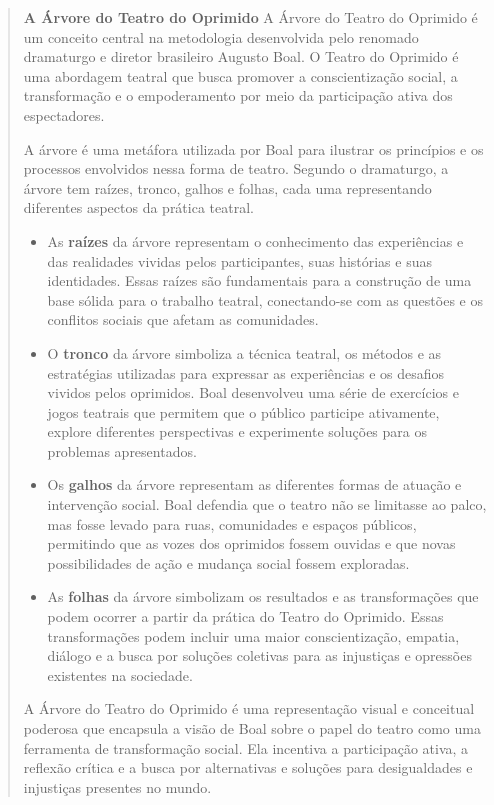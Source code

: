 \begin{quote}
\textbf{A Árvore do Teatro do Oprimido}
A Árvore do Teatro do Oprimido é um conceito central na metodologia desenvolvida pelo renomado dramaturgo e 
diretor brasileiro Augusto Boal. O Teatro do Oprimido é uma abordagem teatral que busca promover a 
conscientização social, a transformação e o empoderamento por meio da participação ativa dos espectadores.

A árvore é uma metáfora utilizada por Boal para ilustrar os princípios e os processos envolvidos nessa 
forma de teatro. Segundo o dramaturgo, a árvore tem raízes, tronco, galhos e folhas, cada uma representando diferentes aspectos da prática teatral.

\begin{itemize}
  \item As \textbf{raízes} da árvore representam o conhecimento das experiências e das realidades vividas 
  pelos participantes, suas histórias e suas identidades. Essas raízes são fundamentais para a construção 
  de uma base sólida para o trabalho teatral, conectando-se com as questões e os conflitos sociais que 
  afetam as comunidades.
  \item O \textbf{tronco} da árvore simboliza a técnica teatral, os métodos e as estratégias utilizadas 
  para expressar as experiências e os desafios vividos pelos oprimidos. Boal desenvolveu uma série de 
  exercícios e jogos teatrais que permitem que o público participe ativamente, explore diferentes 
  perspectivas e experimente soluções para os problemas apresentados.
  \item Os \textbf{galhos} da árvore representam as diferentes formas de atuação e intervenção social. Boal 
  defendia que o teatro não se limitasse ao palco, mas fosse levado para ruas, comunidades e espaços 
  públicos, permitindo que as vozes dos oprimidos fossem ouvidas e que novas possibilidades de ação e 
  mudança social fossem exploradas.
  \item As \textbf{folhas} da árvore simbolizam os resultados e as transformações que podem ocorrer a 
  partir da prática do Teatro do Oprimido. Essas transformações podem incluir uma maior conscientização, 
  empatia, diálogo e a busca por soluções coletivas para as injustiças e opressões existentes na sociedade.
\end{itemize}

A Árvore do Teatro do Oprimido é uma representação visual e conceitual poderosa que encapsula a visão de 
Boal sobre o papel do teatro como uma ferramenta de transformação social. Ela incentiva a participação 
ativa, a reflexão crítica e a busca por alternativas e soluções para desigualdades e injustiças presentes 
no mundo.

\end{quote}

